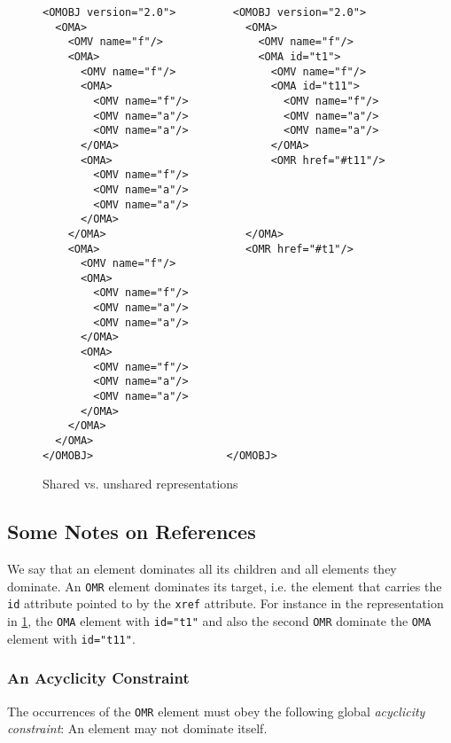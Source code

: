 \begin{figure}\centering
\caption{Shared vs. unshared representations}\label{fig_shared_vs_unshared}
    
\begin{lstlisting}
<OMOBJ version="2.0">         <OMOBJ version="2.0">
  <OMA>                         <OMA>
    <OMV name="f"/>               <OMV name="f"/> 
    <OMA>                         <OMA id="t1">
      <OMV name="f"/>               <OMV name="f"/>
      <OMA>                         <OMA id="t11">
        <OMV name="f"/>               <OMV name="f"/>
        <OMV name="a"/>               <OMV name="a"/>
        <OMV name="a"/>               <OMV name="a"/>
      </OMA>                        </OMA>
      <OMA>                         <OMR href="#t11"/>
        <OMV name="f"/>
        <OMV name="a"/> 
        <OMV name="a"/>
      </OMA>                                
    </OMA>                      </OMA>
    <OMA>                       <OMR href="#t1"/>
      <OMV name="f"/>
      <OMA>
        <OMV name="f"/>
        <OMV name="a"/>
        <OMV name="a"/>
      </OMA>
      <OMA>
        <OMV name="f"/>
        <OMV name="a"/>
        <OMV name="a"/>
      </OMA>
    </OMA>
  </OMA>
</OMOBJ>                     </OMOBJ>
\end{lstlisting}
\end{figure}


\subsection{Some Notes on References}\label{sec_references}

We say that an \OM element dominates all its children and all elements
they dominate. An \lstinline|OMR| element dominates its target,
i.e. the element that carries the \lstinline|id| attribute pointed to
by the \lstinline|xref| attribute. For instance in the representation
in \ref{fig_shared_vs_unshared}, the
\lstinline|OMA| element with \lstinline|id="t1"| and
also the second \lstinline|OMR| dominate the
\lstinline|OMA| element with \lstinline|id="t11"|.



\subsubsection{An Acyclicity Constraint}\label{sec_acyclicity}

The occurrences of the \lstinline|OMR| element must obey the following global
\emph{acyclicity constraint}: An \OM element may not dominate itself.


